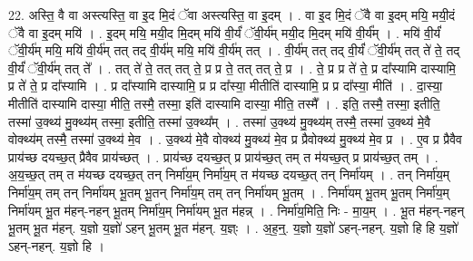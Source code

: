 \documentclass[17pt]{extarticle}
\begin{document}
22. अस्ति॒ वै वा अस्त्यस्ति॒ वा इ॒द मि॒दं ॅवा अस्त्यस्ति॒ वा इ॒दम् । . वा इ॒द मि॒दं ॅवै वा इ॒दम् मयि॒ मयी॒दं ॅवै वा इ॒दम् मयि॑ । . इ॒दम् मयि॒ मयी॒द मि॒दम् मयि॑ वी॒र्यं॑ ॅवी॒र्य॑म् मयी॒द मि॒दम् मयि॑ वी॒र्य᳚म् । . मयि॑ वी॒र्यं॑ ॅवी॒र्य॑म् मयि॒ मयि॑ वी॒र्य॑म् तत् तद् वी॒र्य॑म् मयि॒ मयि॑ वी॒र्य॑म् तत् । . वी॒र्य॑म् तत् तद् वी॒र्यं॑ ॅवी॒र्य॑म् तत् ते॑ ते॒ तद् वी॒र्यं॑ ॅवी॒र्य॑म् तत् ते᳚ । . तत् ते॑ ते॒ तत् तत् ते॒ प्र प्र ते॒ तत् तत् ते॒ प्र । . ते॒ प्र प्र ते॑ ते॒ प्र दा᳚स्यामि दास्यामि॒ प्र ते॑ ते॒ प्र दा᳚स्यामि । . प्र दा᳚स्यामि दास्यामि॒ प्र प्र दा᳚स्या॒ मीतीति॑ दास्यामि॒ प्र प्र दा᳚स्या॒ मीति॑ । . दा॒स्या॒ मीतीति॑ दास्यामि दास्या॒ मीति॒ तस्मै॒ तस्मा॒ इति॑ दास्यामि दास्या॒ मीति॒ तस्मै᳚ । . इति॒ तस्मै॒ तस्मा॒ इतीति॒ तस्मा॑ उ॒क्थ्य॑ मु॒क्थ्य॑म् तस्मा॒ इतीति॒ तस्मा॑ उ॒क्थ्य᳚म् । . तस्मा॑ उ॒क्थ्य॑ मु॒क्थ्य॑म् तस्मै॒ तस्मा॑ उ॒क्थ्य॑ मे॒वै वोक्थ्य॑म् तस्मै॒ तस्मा॑ उ॒क्थ्य॑ मे॒व । . उ॒क्थ्य॑ मे॒वै वोक्थ्य॑ मु॒क्थ्य॑ मे॒व प्र प्रैवोक्थ्य॑ मु॒क्थ्य॑ मे॒व प्र । . ए॒व प्र प्रैवैव प्राय॑च्छ दयच्छ॒त् प्रैवैव प्राय॑च्छत् । . प्राय॑च्छ दयच्छ॒त् प्र प्राय॑च्छ॒त् तम् त म॑यच्छ॒त् प्र प्राय॑च्छ॒त् तम् । . अ॒य॒च्छ॒त् तम् त म॑यच्छ दयच्छ॒त् तन् निर्मा॑य॒म् निर्मा॑य॒म् त म॑यच्छ दयच्छ॒त् तन् निर्मा॑यम् । . तन् निर्मा॑य॒म् निर्मा॑य॒म् तम् तन् निर्मा॑यम् भू॒तम् भू॒तन् निर्मा॑य॒म् तम् तन् निर्मा॑यम् भू॒तम् । . निर्मा॑यम् भू॒तम् भू॒तम् निर्मा॑य॒म् निर्मा॑यम् भू॒त म॑हन्-नहन् भू॒तम् निर्मा॑य॒म् निर्मा॑यम् भू॒त म॑हन्न् । . निर्मा॑य॒मिति॒ निः - मा॒य॒म् । . भू॒त म॑हन्-नहन् भू॒तम् भू॒त म॑हन्. य॒ज्ञो य॒ज्ञो॑ ऽहन् भू॒तम् भू॒त म॑हन्. य॒ज्ञ्ः । . अ॒ह॒न्॒. य॒ज्ञो य॒ज्ञो॑ ऽहन्-नहन्. य॒ज्ञो हि हि य॒ज्ञो॑ ऽहन्-नहन्. य॒ज्ञो हि । \newline
\end{document}
